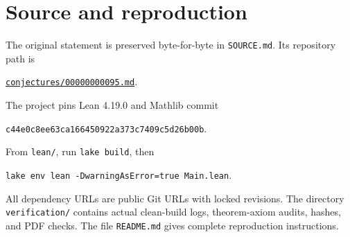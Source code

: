 \documentclass[11pt]{article}
\begin{document}
\section*{Source and reproduction}
The original statement is preserved byte-for-byte in \texttt{SOURCE.md}. Its repository path is
\begin{center}\small\href{https://github.com/The-Last-Math-Competition/The-Last-Math-Competition/blob/main/conjectures/00000000095.md}{\texttt{conjectures/00000000095.md}}.\end{center}
The project pins Lean 4.19.0 and Mathlib commit
\begin{center}\small\texttt{c44e0c8ee63ca166450922a373c7409c5d26b00b}.\end{center}
From \texttt{lean/}, run \texttt{lake build}, then
\begin{center}\small\texttt{lake env lean -DwarningAsError=true Main.lean}.\end{center}
All dependency URLs are public Git URLs with locked revisions. The directory \texttt{verification/} contains actual clean-build logs, theorem-axiom audits, hashes, and PDF checks. The file \texttt{README.md} gives complete reproduction instructions.
\end{document}
